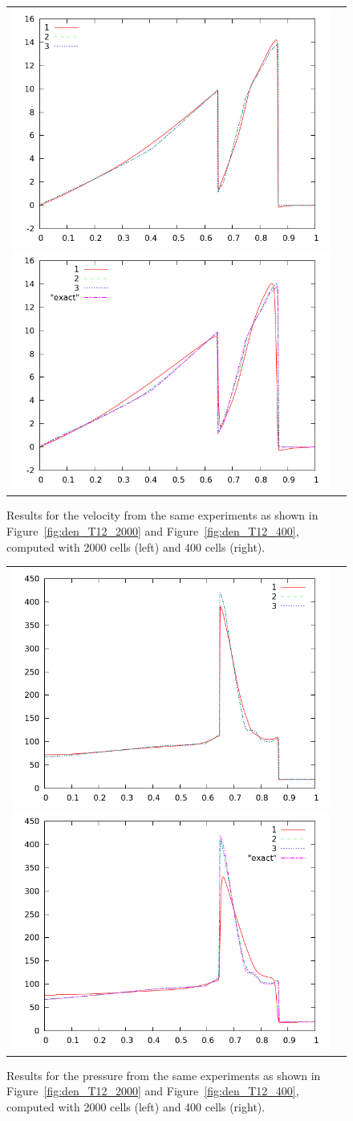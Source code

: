 \documentclass[10pt]{article}
\begin{document}
\begin{figure}[h]
  \begin{center}
	\begin{tabular}{cc}
     \includegraphics[width=.475\textwidth]{vel_T12_2000.png}
     \includegraphics[width=.475\textwidth]{vel_T12_400.png}	
    \end{tabular}
  \end{center}
  \caption{Results for the velocity from the same experiments as shown in Figure~\ref{fig:den_T12_2000} and Figure~\ref{fig:den_T12_400}, computed with 2000 cells (left) and 400 cells (right).}
\end{figure}

\begin{figure}[h]
  \begin{center}
	\begin{tabular}{cc}
     \includegraphics[width=.475\textwidth]{prs_T12_2000.png}
     \includegraphics[width=.475\textwidth]{prs_T12_400.png}
    \end{tabular}	
  \end{center}
  \caption{Results for the pressure from the same experiments as shown in Figure~\ref{fig:den_T12_2000} and Figure~\ref{fig:den_T12_400}, computed with 2000 cells (left) and 400 cells (right).}
\end{figure}
\end{document}
